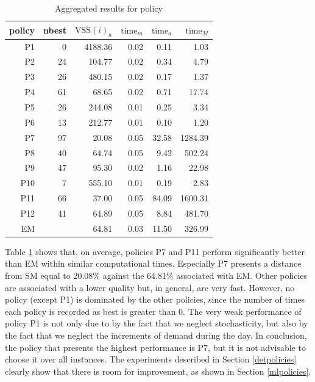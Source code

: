 \documentclass[authoryear,preprint,12pt]{elsarticle}
\begin{document}
\begin{table}[H]
\centering
\begin{tabular}{rrrrrr}
\hline
policy &  nbest & $\text{VSS}(i)_a$ & $\text{time}_m$ & $\text{time}_a$ & $\text{time}_M$ \\
\hline
P1   & 0     & 4188.36 & 0.02    & 0.11    & 1.03    \\
P2  & 24    & 104.77  & 0.02    & 0.34    & 4.79    \\
P3  & 26    & 480.15  & 0.02    & 0.17    & 1.37    \\
P4    & 61    & 68.65  & 0.02    & 0.71    & 17.74   \\
P5   & 26    & 244.08  & 0.01    & 0.25    & 3.34    \\
P6   & 13    & 212.77  & 0.01    & 0.10     & 1.20     \\
P7   & 97    & 20.08  & 0.05    & 32.58   & 1284.39 \\
P8    & 40    & 64.74  & 0.05    & 9.42    & 502.24  \\
P9    & 47    & 95.30  & 0.02    & 1.16    & 22.98   \\
P10  & 7     & 555.10  & 0.01    & 0.19    & 2.83    \\
P11   & 66    & 37.00  & 0.05    & 84.09   & 1600.31 \\
P12   & 41    & 64.89  & 0.05    & 8.84    & 481.70 \\
\hline
EM  &  & 64.81 & 0.03 & 11.50 & 326.99\\ 
\end{tabular}
\caption{Aggregated results for policy}\label{tab:results_policies}
\end{table}

Table \ref{tab:results_policies} shows that, on average, policies P7 and P11 perform significantly better than EM within similar computational times. Especially P7 presents a distance from SM equal to 20.08\% against the 64.81\% associated with EM. Other policies are associated with a lower quality but, in general, are very fast. However, no policy (except P1) is dominated by the other policies, since 
the number of times each policy is recorded as best is greater than 0. The very weak performance of policy P1 is not only due to by the fact that we neglect stochasticity, but also by the fact that we neglect the increments of demand during the day.
In conclusion, the policy that presents the highest performance is P7, but it is not advisable to choose it over all instances. The experiments described in Section \ref{detpolicies} clearly show that there is room for improvement, as shown in Section \ref{mlpolicies}.    
\end{document}
